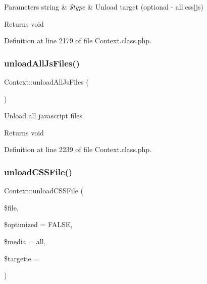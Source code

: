 \begin{DoxyParams}[1]{Parameters}
string & {\em \$type} & Unload target (optional -\/ all$\vert$css$\vert$js) \\
\hline
\end{DoxyParams}
\begin{DoxyReturn}{Returns}
void 
\end{DoxyReturn}


Definition at line 2179 of file Context.\+class.\+php.

\mbox{\label{classContext_ac8ac4c21583b50815eb01d9cc4f6405f}} 
\subsubsection{\texorpdfstring{unload\+All\+Js\+Files()}{unloadAllJsFiles()}}
{\footnotesize\ttfamily Context\+::unload\+All\+Js\+Files (\begin{DoxyParamCaption}{ }\end{DoxyParamCaption})}

Unload all javascript files

\begin{DoxyReturn}{Returns}
void 
\end{DoxyReturn}


Definition at line 2239 of file Context.\+class.\+php.

\mbox{\label{classContext_a26b1057bf312eeda0fbfcb28256c406c}} 
\subsubsection{\texorpdfstring{unload\+C\+S\+S\+File()}{unloadCSSFile()}}
{\footnotesize\ttfamily Context\+::unload\+C\+S\+S\+File (\begin{DoxyParamCaption}\item[{}]{\$file,  }\item[{}]{\$optimized = {\ttfamily FALSE},  }\item[{}]{\$media = {\ttfamily \textquotesingle{}all\textquotesingle{}},  }\item[{}]{\$targetie = {\ttfamily \textquotesingle{}\textquotesingle{}} }\end{DoxyParamCaption})}

